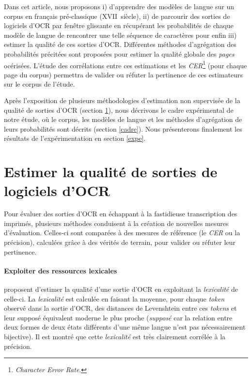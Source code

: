 \documentclass[10pt,twoside]{article}
\begin{document}
Dans cet article, nous proposons i) d'apprendre des modèles de langue sur un corpus en français pré-classique (XVII\ieme~siècle), 
ii) de parcourir des sorties de logiciels d'OCR par fenêtre glissante en récupérant les probabilités de chaque
modèle de langue de rencontrer une telle séquence de caractères pour enfin iii) estimer la qualité de ces sorties d'OCR. 
Différentes méthodes d'agrégation des probabilités précitées sont proposées pour estimer la qualité globale des \textit{pages} 
océrisées. L'étude des corrélations entre ces estimations et les \textit{CER}\footnote{\textit{Character Error Rate}.} (pour chaque page du corpus) 
permettra de valider ou réfuter la pertinence de ces estimateurs sur le corpus de l'étude.

Après l'exposition de plusieurs méthodologies d'estimation non supervisée de la qualité de sorties d'OCR (section \ref{eda}),
nous décrivons le cadre expérimental de notre étude, où le corpus, les modèles de langue et les méthodes d'agrégation
de leurs probabilités sont décrits (section \ref{cadre}). Nous présenterons finalement les résultats de l'expérimentation
en section \ref{expe}.

\section{Estimer la qualité de sorties de logiciels d'OCR}\label{eda}
Pour évaluer des sorties d'OCR en échappant à la fastidieuse transcription des imprimés, plusieurs 
méthodes conduisent à la création de nouvelles mesures d'évaluation. Celles-ci sont comparées à des mesures de référence (le \textit{CER} ou la précision),
calculées grâce à des vérités de terrain, pour valider ou réfuter leur pertinence.

    \paragraph{Exploiter des ressources lexicales}
    \cite{Springmann2016a} proposent d'estimer la qualité d'une sortie d'OCR en exploitant la \textit{lexicalité}
    de celle-ci. La \textit{lexicalité} est calculée en faisant la moyenne, pour chaque \textit{token} observé dans la 
    sortie d'OCR, des distances de Levenshtein entre ces \textit{tokens} et leur supposé équivalent moderne le plus 
    proche (\textit{supposé} car la relation
    entre deux formes de deux états différents d'une même langue n'est pas nécessairement bijective). Il est montré que cette
    \textit{lexicalité} est très clairement corrélée à la précision.
\end{document}
